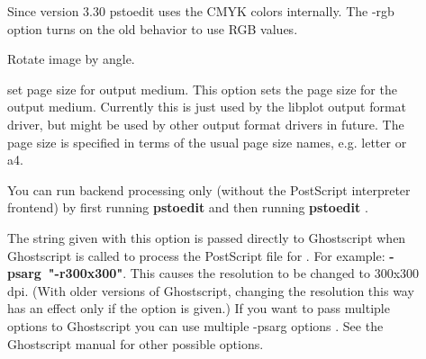\documentclass[english,a4paper]{article}
\begin{document}
\begin{description}
\item[]
Since version 3.30 pstoedit uses the CMYK colors internally. The -rgb option turns on the old behavior to use RGB values.


\item[]



\item[]



\item[]
Rotate image by angle.


\item[]
set page size for output medium.
This option sets the page size for the output medium. Currently this is just used by the libplot output format driver, but might be used by other output format drivers in future. The page size is specified in terms of the usual page size names, e.g. letter or a4.


\item[]



\item[]



\item[]
You can run backend processing only (without the PostScript interpreter frontend) by first running \textbf{pstoedit}    and then running \textbf{pstoedit}     .


\item[]
The string given with this option is passed directly to Ghostscript when Ghostscript is called to process the PostScript file for . For example:      \textbf{-psarg}\textbf{~"}\textbf{-r300x300}\textbf{"}. This causes the resolution to be changed to 300x300 dpi. (With older versions of Ghostscript, changing the resolution this way has an effect only if the  option is given.) If you want to pass multiple options to Ghostscript you can use multiple -psarg options   . See the Ghostscript manual for other possible options.


\item[]




\end{description}
\end{document}
